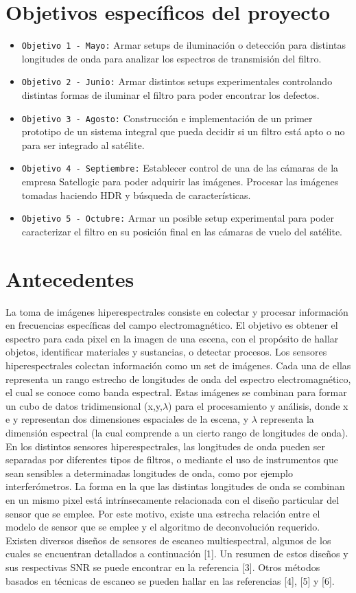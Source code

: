 \documentclass{ctuthesis}
\begin{document}
\section*{Objetivos específicos del proyecto}
\begin{itemize}
	\item \texttt{Objetivo 1 - Mayo:} Armar setups de iluminación o detección para distintas longitudes de onda para analizar
	los espectros de transmisión del filtro.
	\item \texttt{Objetivo 2 - Junio:} Armar distintos setups experimentales controlando distintas formas de iluminar el filtro
	para poder encontrar los defectos.
	\item \texttt{Objetivo 3 - Agosto:} Construcción e implementación de un primer prototipo de un sistema integral que pueda decidir si un filtro está apto o no para ser integrado al satélite.
	\item \texttt{Objetivo 4 - Septiembre:} Establecer control de una de las cámaras de la empresa Satellogic para poder adquirir las
	imágenes. Procesar las imágenes tomadas haciendo HDR y búsqueda de características.
	\item \texttt{Objetivo 5 - Octubre:} Armar un posible setup experimental para poder caracterizar el filtro en su posición final
	en las cámaras de vuelo del satélite.
\end{itemize}
\section*{Antecedentes}
La toma de imágenes hiperespectrales consiste en colectar y procesar información en frecuencias específicas del campo electromagnético. El objetivo es obtener el espectro para cada pixel en la imagen de una escena, con el propósito de hallar objetos, identificar materiales y sustancias, o detectar procesos.
Los sensores hiperespectrales colectan información como un  set de imágenes. Cada una de ellas representa un rango estrecho de longitudes de onda del espectro electromagnético, el cual se conoce como banda espectral. Estas imágenes se combinan para formar un cubo de datos tridimensional (x,y,$\lambda$) para el procesamiento y análisis, donde x e y representan dos dimensiones espaciales de la escena, y $\lambda$ representa la dimensión espectral (la cual comprende a un cierto rango de longitudes de onda).
En los distintos sensores hiperespectrales, las longitudes de onda pueden ser separadas por diferentes tipos de filtros, o mediante el uso de instrumentos que sean sensibles a determinadas longitudes de onda, como por ejemplo interferómetros. La forma en la que las distintas longitudes de onda se combinan en un mismo pixel está intrínsecamente relacionada con el diseño particular del sensor que se emplee. Por este motivo, existe una estrecha relación entre el modelo de sensor que se emplee y el algoritmo de deconvolución requerido. Existen diversos diseños de sensores de escaneo multiespectral, algunos de los cuales se encuentran detallados a continuación [1]. Un resumen de estos diseños y sus respectivas SNR se puede encontrar en la referencia [3]. Otros métodos basados en técnicas de escaneo se pueden hallar en las referencias [4], [5] y  [6]. 
\end{document}
